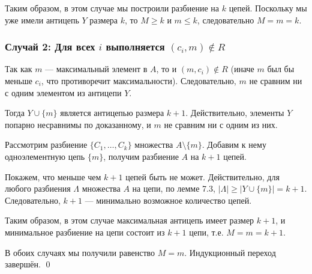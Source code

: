 \documentclass[a4paper,12pt]{article}
\begin{document}
	Таким образом, в этом случае мы построили разбиение на $k$ цепей. Поскольку мы уже имели антицепь $Y$ размера $k$, то $M \ge k$ и $m \le k$, следовательно $M = m = k$.
	
	\subsubsection{Случай 2: Для всех $i$ выполняется $(c_i, m) \notin R$}
	
	Так как $m$ — максимальный элемент в $A$, то и $(m, c_i) \notin R$ (иначе $m$ был бы меньше $c_i$, что противоречит максимальности). Следовательно, $m$ не сравним ни с одним элементом из антицепи $Y$.
	
	\begin{center}
	\end{center}
	
	Тогда $Y \cup \{m\}$ является антицепью размера $k+1$. Действительно, элементы $Y$ попарно несравнимы по доказанному, и $m$ не сравним ни с одним из них.
	
	Рассмотрим разбиение $\{C_1, \dots, C_k\}$ множества $A \setminus \{m\}$. Добавим к нему одноэлементную цепь $\{m\}$, получим разбиение $A$ на $k+1$ цепей.
	
	Покажем, что меньше чем $k+1$ цепей быть не может. Действительно, для любого разбиения $\Lambda$ множества $A$ на цепи, по лемме 7.3, $|\Lambda| \ge |Y \cup \{m\}| = k+1$. Следовательно, $k+1$ — минимально возможное количество цепей.
	
	Таким образом, в этом случае максимальная антицепь имеет размер $k+1$, и минимальное разбиение на цепи состоит из $k+1$ цепи, т.е. $M = m = k+1$.
	
	В обоих случаях мы получили равенство $M = m$. Индукционный переход завершён. \qed
	
	
	
	
	
\end{document}
